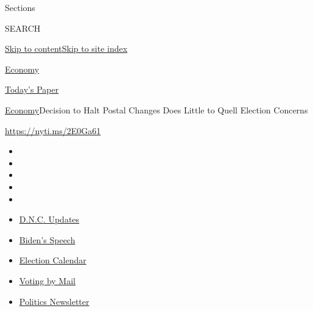 Sections

SEARCH

\protect\hyperlink{site-content}{Skip to
content}\protect\hyperlink{site-index}{Skip to site index}

\href{https://www.nytimes3xbfgragh.onion/section/business/economy}{Economy}

\href{https://myaccount.nytimes3xbfgragh.onion/auth/login?response_type=cookie\&client_id=vi}{}

\href{https://www.nytimes3xbfgragh.onion/section/todayspaper}{Today's
Paper}

\href{/section/business/economy}{Economy}\textbar{}Decision to Halt
Postal Changes Does Little to Quell Election Concerns

\url{https://nyti.ms/2E0Ga61}

\begin{itemize}
\item
\item
\item
\item
\item
\end{itemize}

\begin{itemize}
\item
  \href{https://www.nytimes3xbfgragh.onion/live/2020/08/20/us/dnc-convention-election?action=click\&pgtype=Article\&state=default\&region=TOP_BANNER\&context=storylines_menu}{D.N.C.
  Updates}
\item
  \href{https://www.nytimes3xbfgragh.onion/2020/08/20/us/politics/biden-presidential-nomination-dnc.html?action=click\&pgtype=Article\&state=default\&region=TOP_BANNER\&context=storylines_menu}{Biden's
  Speech}
\item
  \href{https://www.nytimes3xbfgragh.onion/interactive/2019/us/elections/2020-presidential-election-calendar.html?action=click\&pgtype=Article\&state=default\&region=TOP_BANNER\&context=storylines_menu}{Election
  Calendar}
\item
  \href{https://www.nytimes3xbfgragh.onion/interactive/2020/08/11/us/politics/vote-by-mail-us-states.html?action=click\&pgtype=Article\&state=default\&region=TOP_BANNER\&context=storylines_menu}{Voting
  by Mail}
\item
  \href{https://www.nytimes3xbfgragh.onion/newsletters/politics?action=click\&pgtype=Article\&state=default\&region=TOP_BANNER\&context=storylines_menu}{Politics
  Newsletter}
\end{itemize}

